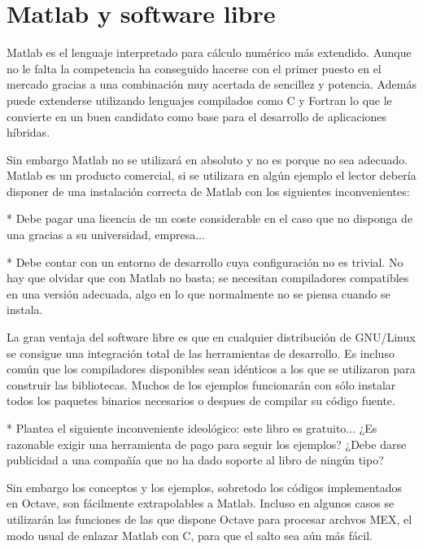 \section{Matlab y software libre}

Matlab es el lenguaje interpretado para cálculo numérico más
extendido.  Aunque no le falta la competencia ha conseguido hacerse
con el primer puesto en el mercado gracias a una combinación muy
acertada de sencillez y potencia.  Además puede extenderse utilizando
lenguajes compilados como C y Fortran lo que le convierte en un buen
candidato como base para el desarrollo de aplicaciones híbridas.

Sin embargo Matlab no se utilizará en absoluto y no es porque no sea
adecuado.  Matlab es un producto comercial, si se utilizara en algún
ejemplo el lector debería disponer de una instalación correcta de
Matlab con los siguientes inconvenientes:

* Debe pagar una licencia de un coste considerable en el caso
  que no disponga de una gracias a su universidad, empresa...

* Debe contar con un entorno de desarrollo cuya configuración no es
  trivial. No hay que olvidar que con Matlab no basta; se necesitan
  compiladores compatibles en una versión adecuada, algo en lo que
  normalmente no se piensa cuando se instala.

  La gran ventaja del software libre es que en cualquier distribución
  de GNU/Linux se consigue una integración total de las herramientas
  de desarrollo.  Es incluso común que los compiladores disponibles
  sean idénticos a los que se utilizaron para construir las
  bibliotecas.  Muchos de los ejemplos funcionarán con sólo instalar
  todos los paquetes binarios necesarios o despues de compilar su
  código fuente.

* Plantea el siguiente inconveniente ideológico: este libro es
  gratuito... ¿Es razonable exigir una herramienta de pago para seguir
  los ejemplos?  ¿Debe darse publicidad a una compañía que no ha dado
  soporte al libro de ningún tipo?


Sin embargo los conceptos y los ejemplos, sobretodo los códigos
implementados en Octave, son fácilmente extrapolables a Matlab.
Incluso en algunos casos se utilizarán las funciones de las que
dispone Octave para procesar archvos MEX, el modo usual de enlazar
Matlab con C, para que el salto sea aún más fácil.
